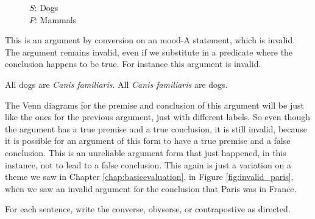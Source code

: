 \begin{figure}[H]
\begin{center}
\end{center}
\captionsetup{singlelinecheck=on}
\caption*{$S$: Dogs \\ $P$: Mammals}
\end{figure}

This is an argument by conversion on an mood-A statement, which is invalid. The argument remains invalid, even if we substitute in a predicate where the conclusion happens to be true. For instance this argument is invalid.

\begin{earg*}
\item  All dogs are \textit{Canis familiaris}.
\itemc[.4] All \textit{Canis familiaris} are dogs. 
\end{earg*}

The Venn diagrams for the premise and conclusion of this argument will be just like the ones for the previous argument, just with different labels. So even though the argument has a true premise and a true conclusion, it is still invalid, because it is possible for an argument of this form to have a true premise and a false conclusion. This is an unreliable argument form that just happened, in this instance, not to lead to a false conclusion. This again is just a variation on a theme we saw in Chapter \ref{chap:basicevaluation}, in Figure \ref{fig:invalid_paris}, when we saw an invalid argument for the conclusion that Paris was in France.



\practiceproblems

\noindent \problempart For each sentence, write the converse, obvserse, or contrapostive as directed.

